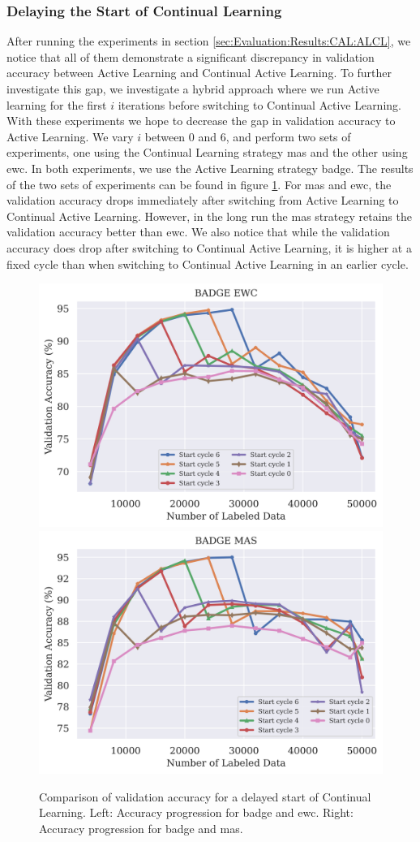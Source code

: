 \subsubsection{Delaying the Start of Continual Learning}
\label{sec:Evaluation:Results:CAL:Hybrid}
After running the experiments in section \ref{sec:Evaluation:Results:CAL:ALCL}, we notice that all of them demonstrate a significant discrepancy in validation accuracy between Active Learning and Continual Active Learning. To further investigate this gap,
we investigate a hybrid approach where we run Active learning for the first $i$ iterations before switching to Continual Active Learning. With these experiments we hope to decrease the gap in validation accuracy to Active Learning. We vary $i$ between 0 and 6,
and perform two sets of experiments, one using the Continual Learning strategy \gls{mas} and the other using \gls{ewc}. In both experiments, we use the Active Learning strategy \gls{badge}. The results of the two sets of experiments can be found in figure 
\ref{fig:Evaluation:Results:CAL:DelayedStart}. For \gls{mas} and \gls{ewc}, the validation accuracy drops immediately after switching from Active Learning to Continual Active Learning. However, in the long run the \gls{mas} strategy retains the validation accuracy better than \gls{ewc}.
We also notice that while the validation accuracy does drop after switching to Continual Active Learning, it is higher at a fixed cycle than when switching to Continual Active Learning in an earlier cycle. \par

\begin{figure}[h]
    \centering
    \includegraphics[width=0.45\linewidth]{images/results_CAL/delayed_start_badge_ewc.png} \hfill
    \includegraphics[width=0.45\linewidth]{images/results_CAL/delayed_start_badge_mas.png}
    \caption[Continual Active Learning Hybrid approach]{Comparison of validation accuracy for a delayed start of Continual Learning. Left: Accuracy progression for \gls{badge} and \gls{ewc}. Right: Accuracy progression for \gls{badge} and \gls{mas}.}
    \label{fig:Evaluation:Results:CAL:DelayedStart}
\end{figure}

